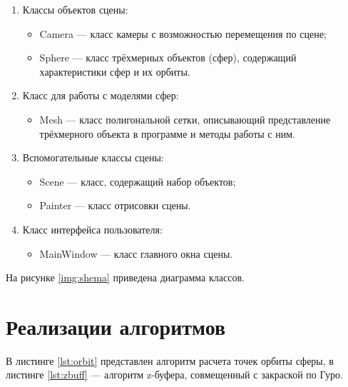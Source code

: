 \begin{enumerate}
	\item Классы объектов сцены:
	\begin{itemize}
		\item Camera --- класс камеры с возможностью перемещения по сцене;
		\item Sphere --- класс трёхмерных объектов (сфер), содержащий характеристики сфер и их орбиты.
	\end{itemize}
        \item Класс для работы с моделями сфер:
	\begin{itemize}
		\item Mesh --- класс полигональной сетки, описывающий представление трёхмерного объекта в программе и методы работы с ним.
	\end{itemize}
	\item Вспомогательные классы сцены:
	\begin{itemize}
		\item Scene --- класс, содержащий набор объектов;
            \item Painter --- класс отрисовки сцены.
	\end{itemize}
	\item Класс интерфейса пользователя:
	\begin{itemize}
		\item MainWindow --- класс главного окна сцены. 
	\end{itemize}	
\end{enumerate}

На рисунке \ref{img:shema} приведена диаграмма классов.



\section{Реализации алгоритмов}

В листинге \ref{lst:orbit} представлен алгоритм расчета точек орбиты сферы, в листинге \ref{lst:zbuff} --- алгоритм z-буфера, совмещенный с закраской по Гуро.


